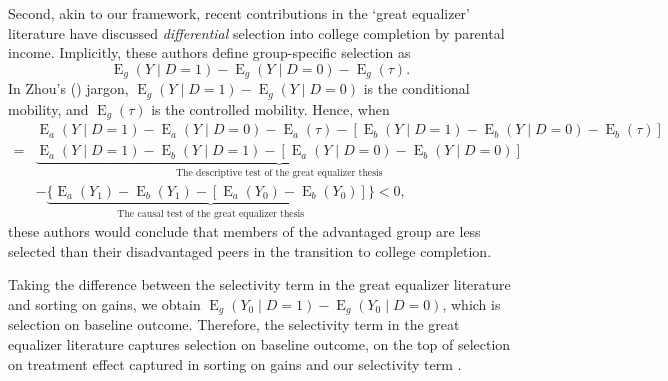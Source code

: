 \documentclass[12pt,a4paper]{article}
\newcommand{\E}{\operatorname{E}}
\begin{document}
Second, akin to our framework, recent contributions in the `great equalizer' literature  \citep{zhou_equalization_2019, fiel_great_2020, karlson_college_2019} have discussed \emph{differential} selection into college completion by parental income. Implicitly, these authors define group-specific selection as 
\begin{equation*}
    \E_g(Y \mid  D=1) - \E_g(Y \mid  D=0) - \E_g(\tau).
\end{equation*}
In Zhou's (\citeyear{zhou_equalization_2019}) jargon, $\E_g(Y \mid  D=1) - \E_g(Y \mid  D=0)$ is the conditional mobility, and $\E_g(\tau)$ is the controlled mobility. 
Hence, when
\begin{align*}
    \phantom{{}={}}& \E_a(Y \mid  D=1) - \E_a(Y  \mid  D=0) - \E_a(\tau) - [\E_b(Y \mid  D=1) - \E_b(Y  \mid  D=0) - \E_b(\tau)] \\
    =& \underbrace{\E_a(Y \mid  D=1)-\E_b(Y \mid  D=1) - [ \E_a(Y \mid  D=0)-\E_b(Y \mid  D=0)]}_{\text{The descriptive test of the great equalizer thesis}}  \\
    \phantom{{}={}}&- \underbrace{\lbrace \E_a(Y_1)-\E_b(Y_1) - [\E_a(Y_0)-\E_b(Y_0)] \rbrace}_{\text{The causal test of the great equalizer thesis}}  < 0,
\end{align*}
these authors would conclude that members of the advantaged group are less selected than their disadvantaged peers in the transition to college completion. 

Taking the difference between the selectivity term in the great equalizer literature and sorting on gains, we obtain $\E_g(Y_0 \mid  D=1)-\E_g(Y_0 \mid  D=0)$, which is selection on baseline outcome.
Therefore, the selectivity term in the great equalizer literature captures  selection on baseline outcome, on the top of selection on treatment effect captured in sorting on gains and our selectivity term \citep[See][p.58-9]{morgan_counterfactuals_2014}. 
\end{document}
